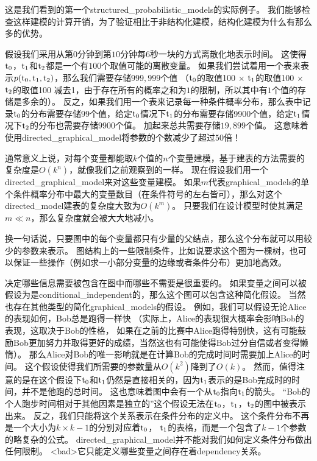 这是我们看到的第一个\gls{structured_probabilistic_models}的实际例子。
我们能够检查这样建模的计算开销，为了验证相比于非结构化建模，结构化建模为什么有那么多的优势。


假设我们采用从第$0$分钟到第$10$分钟每$6$秒一块的方式离散化地表示时间。
这使得$\mathrm{t}_0$，$\mathrm{t}_1$和$\mathrm{t}_2$都是一个有$100$个取值可能的离散变量。
如果我们尝试着用一个表来表示$p(\mathrm{t}_0, \mathrm{t}_1, \mathrm{t}_2)$，那么我们需要存储$999,999$个值
（$\mathrm{t}_0$的取值100 $\times$ $\mathrm{t}_1$的取值100 $\times$ $\mathrm{t}_2$的取值100 减去1，由于存在所有的概率之和为$1$的限制，所以其中有$1$个值的存储是多余的）。
反之，如果我们用一个表来记录每一种条件概率分布，那么表中记录$\mathrm{t}_0$的分布需要存储$99$个值，给定$\mathrm{t}_0$情况下$\mathrm{t}_1$的分布需要存储9900个值，给定$\mathrm{t}_1$情况下$\mathrm{t}_2$的分布也需要存储$9900$个值。
加起来总共需要存储$19, 899$个值。
这意味着使用\gls{directed_graphical_model}将参数的个数减少了超过$50$倍！


通常意义上说，对每个变量都能取$k$个值的$n$个变量建模，基于建表的方法需要的复杂度是$O(k^n)$，就像我们之前观察到的一样。
现在假设我们用一个\gls{directed_graphical_model}来对这些变量建模。
如果$m$代表\gls{graphical_models}的单个条件概率分布中最大的变量数目（在条件符号的左右皆可），那么对这个\gls{directed_model}建表的复杂度大致为$O(k^m)$。
只要我们在设计模型时使其满足$m\ll n$，那么复杂度就会被大大地减小。


换一句话说，只要图中的每个变量都只有少量的父结点，那么这个分布就可以用较少的参数来表示。
图结构上的一些限制条件，比如说要求这个图为一棵树，也可以保证一些操作（例如求一小部分变量的边缘或者条件分布）更加地高效。



决定哪些信息需要被包含在图中而哪些不需要是很重要的。
如果变量之间可以被假设为是\gls{conditional_independent}的，那么这个图可以包含这种简化假设。
当然也存在其他类型的简化\gls{graphical_models}的假设。
例如，我们可以假设无论Alice的表现如何，Bob总是跑得一样快
（实际上，Alice的表现很大概率会影响Bob的表现，这取决于Bob的性格，
如果在之前的比赛中Alice跑得特别快，这有可能鼓励Bob更加努力并取得更好的成绩，当然这也有可能使得Bob过分自信或者变得懒惰）。
那么Alice对Bob的唯一影响就是在计算Bob的完成时间时需要加上Alice的时间。
这个假设使得我们所需要的参数量从$O(k^2)$降到了$O(k)$。
然而，值得注意的是在这个假设下$\mathrm{t}_0$和$\mathrm{t}_1$仍然是直接相关的，因为$\mathrm{t}_1$表示的是Bob完成时的时间，并不是他跑的总时间。
这也意味着图中会有一个从$\mathrm{t}_0$指向$\mathrm{t}_1$的箭头。
``Bob的个人跑步时间相对于其他因素是独立的''这个假设无法在$\mathrm{t}_0$，$\mathrm{t}_1$，$\mathrm{t}_2$的图中被表示出来。
反之，我们只能将这个关系表示在条件分布的定义中。
这个条件分布不再是一个大小为$k\times k-1$的分别对应着$\mathrm{t}_0$，  $\mathrm{t}_1$的表格，而是一个包含了$k-1$个参数的略复杂的公式。
\gls{directed_graphical_model}并不能对我们如何定义条件分布做出任何限制。
<bad>它只能定义哪些变量之间存在着\gls{dependency}关系。



